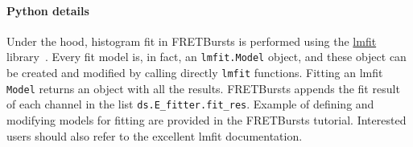 \paragraph{Python details}
Under the hood, histogram fit in FRETBursts is performed using the
\href{http://lmfit.github.io/lmfit-py/}{lmfit} library~\cite{lmfit}.
Every fit model is, in fact, an \verb|lmfit.Model| object, and these object
can be created and modified by calling directly \verb|lmfit| functions.
Fitting an lmfit \verb|Model| returns an object with all the results.
FRETBursts appends the fit result of each channel in the list 
\verb|ds.E_fitter.fit_res|.
Example of defining and modifying models for fitting are provided in the FRETBursts tutorial. 
Interested users should also refer to the excellent lmfit documentation.

